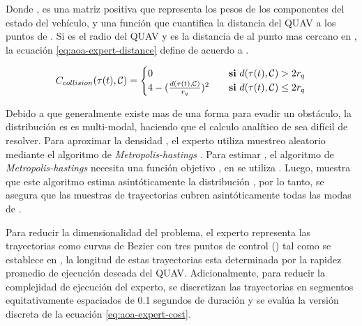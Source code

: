 Donde ,  es una matriz positiva que representa los pesos de los componentes del estado del vehículo, y  una función que cuantifica la distancia del QUAV a los puntos de . Si  es el radio del QUAV y  es la distancia de  al punto mas cercano en , la ecuación \ref{eq:aoa-expert-distance} define  de acuerdo a \cite{Loquercio2021}.

\begin{equation}
\label{eq:aoa-expert-distance}
    C_{collision}(\tau(t), \mathcal{C}) = \begin{cases}
        0                                               & \quad\text{\textbf{si} } d(\tau(t), \mathcal{C}) > 2 r_q \\
        4 - (\frac{d(\tau(t), \mathcal{C})}{r_q})^{2}   & \quad\text{\textbf{si} } d(\tau(t), \mathcal{C}) \leq 2 r_q
    \end{cases}
\end{equation}

Debido a que generalmente existe mas de una forma para evadir un obstáculo, la distribución es  es multi-modal, haciendo que el calculo analítico de  sea difícil de resolver. Para aproximar la densidad , el experto utiliza muestreo aleatorio mediante el algoritmo de \textit{Metropolis-hastings} \cite{hastings1970monte}. Para estimar , el algoritmo de \textit{Metropolis-hastings} necesita una función objetivo , en \cite{Loquercio2021} se utiliza . Luego, \cite{Loquercio2021} muestra que este algoritmo estima asintóticamente la distribución , por lo tanto, se asegura que las muestras de trayectorias cubren asintóticamente todas las modas de .

Para reducir la dimensionalidad del problema, el experto representa las trayectorias \jim{\tau} como curvas de Bezier con tres puntos de control () tal como se establece en \cite{mellinger2011minimum}, la longitud de estas trayectorias esta determinada por la rapidez promedio de ejecución deseada del QUAV. Adicionalmente, para reducir la complejidad de ejecución del experto, se discretizan las trayectorias en segmentos equitativamente espaciados de 0.1 segundos de duración y se evalúa la versión discreta de la ecuación \ref{eq:aoa-expert-cost}.

